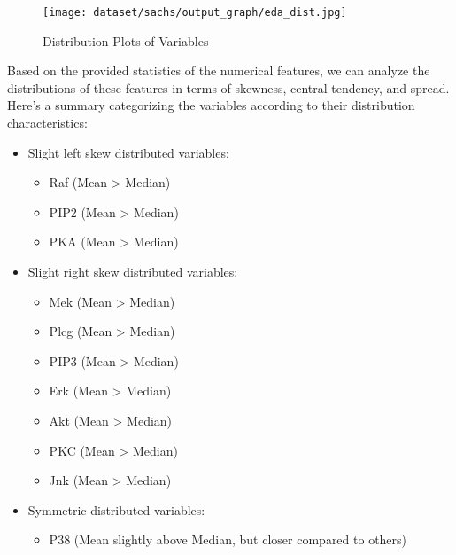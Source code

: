 \documentclass{article}
\begin{document}
\begin{figure}[H]
\centering
\texttt{[image: dataset/sachs/output\_graph/eda\_dist.jpg]}
\caption{\label{fig:dist}Distribution Plots of Variables}
\end{figure}

Based on the provided statistics of the numerical features, we can analyze the distributions of these features in terms of skewness, central tendency, and spread. Here’s a summary categorizing the variables according to their distribution characteristics:

\begin{itemize}
\item Slight left skew distributed variables: 
\begin{itemize}
    \item Raf (Mean > Median)
    \item PIP2 (Mean > Median)
    \item PKA (Mean > Median)
\end{itemize}

\item Slight right skew distributed variables: 
\begin{itemize}
    \item Mek (Mean > Median)
    \item Plcg (Mean > Median)
    \item PIP3 (Mean > Median)
    \item Erk (Mean > Median)
    \item Akt (Mean > Median)
    \item PKC (Mean > Median)
    \item Jnk (Mean > Median)
\end{itemize}

\item Symmetric distributed variables: 
\begin{itemize}
    \item P38 (Mean slightly above Median, but closer compared to others)
\end{itemize}

\end{itemize}
\end{document}
